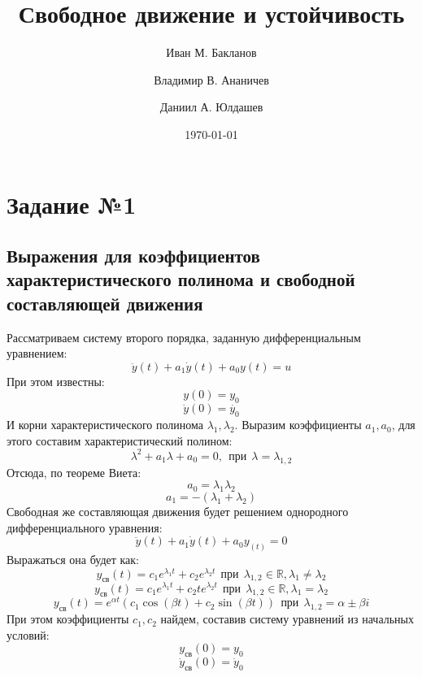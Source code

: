 \documentclass[a4paper, 12pt]{article}
\title{
Свободное движение и устойчивость
}
\author{Иван М. Бакланов}
\affil{465112, ibaklanov@niuitmo.ru}
\author{Владимир В. Ананичев}
\affil{464994, vandmitrievic@mail.ru}
\author{Даниил А. Юлдашев}
\affil{468158}
\date{\today}
\begin{document}
\maketitle

\tableofcontents

\newpage


\section{Задание №1}
\subsection{Выражения для коэффициентов характеристического полинома и свободной составляющей движения}
Рассматриваем систему второго порядка, заданную дифференциальным уравнением:
\[
\ddot{y}(t) + a_1\dot{y}(t) + a_0y(t) = u
\]
При этом известны:
\[
    y(0) = y_0
\]
\[
    \dot{y}(0) = \dot{y_0}
\]
И корни характеристического полинома
$\lambda_1, \lambda_2$.
\newline
Выразим коэффициенты $a_1, a_0$, для этого составим характеристический полином:
\[
    \lambda^2 + a_1 \lambda + a_0 = 0, \ \ \textit{при} \ \ \lambda = \lambda_{1,2}
\]
Отсюда, по теореме Виета:
\[
    a_0 = \lambda_1 \lambda_2
\]
\[
    a_1 = -(\lambda_1 + \lambda_2)
\]
Свободная же составляющая движения будет решением однородного дифференциального уравнения:
\[
    \ddot{y}(t) + a_1\dot{y}(t) + a_0y_(t) = 0
\]
Выражаться она будет как:
\[
    y_{\textit{св}}(t) = c_1e^{\lambda_1t} + c_2e^{\lambda_2t} \ \ \textit{при} \ \ \lambda_{1,2} \in \mathbb{R}, \lambda_1 \neq \lambda_2
\]
\[
    y_{\textit{св}}(t) = c_1e^{\lambda_1t} + c_2te^{\lambda_2t} \ \ \textit{при} \ \ \lambda_{1,2} \in \mathbb{R}, \lambda_1 = \lambda_2
\]
\[
    y_{\textit{св}}(t) = e^{\alpha t}(c_1 \cos{(\beta t)} + c_2 \sin{(\beta t)})  \ \ \textit{при} \ \ \lambda_{1,2} = \alpha \pm \beta i
\]
При этом коэффициенты $c_1, c_2$ найдем, составив систему уравнений из начальных условий:
\[
    y_{\textit{св}}(0) = y_0 
\]
\[
    \dot{y}_{\textit{св}}(0) = \dot{y}_0
\]
\newpage
\end{document}
